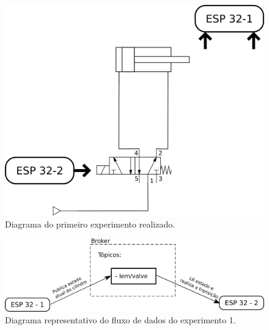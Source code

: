 \begin{figure}[htb]
    \begin{center}
	    \includegraphics[scale=0.5]{figs/diag_exp1.png}
	\end{center}
	\caption{\label{fig:exp1} Diagrama do primeiro experimento realizado.} 
\end{figure}


\begin{figure}[htb]
    \begin{center}
	    \includegraphics[width=400pt]{figs/diag_data_exp1.png}
	\end{center}
	\caption{\label{fig:exp1data} Diagrama representativo do fluxo de dados do experimento 1.} 
\end{figure}

